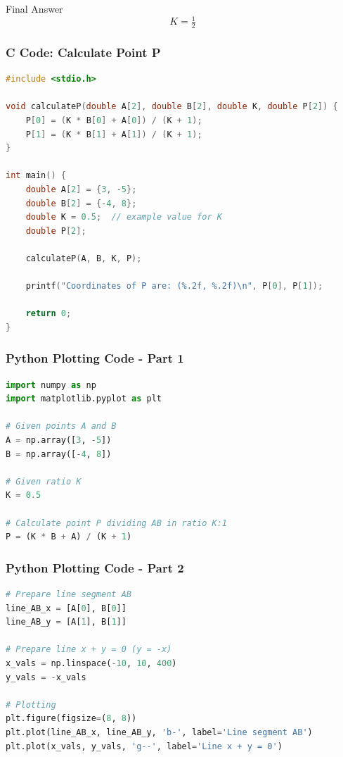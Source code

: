 \documentclass{beamer}
\begin{document}
\begin{frame}{Final Answer}
\[
\boxed{K = \tfrac{1}{2}}
\]
\end{frame}

\begin{frame}[fragile]
\frametitle{\textbf{C Code: Calculate Point P}}
\begin{lstlisting}[language=C]
#include <stdio.h>

void calculateP(double A[2], double B[2], double K, double P[2]) {
    P[0] = (K * B[0] + A[0]) / (K + 1);
    P[1] = (K * B[1] + A[1]) / (K + 1);
}

int main() {
    double A[2] = {3, -5};
    double B[2] = {-4, 8};
    double K = 0.5;  // example value for K
    double P[2];

    calculateP(A, B, K, P);

    printf("Coordinates of P are: (%.2f, %.2f)\n", P[0], P[1]);

    return 0;
}
\end{lstlisting}
\end{frame}

\begin{frame}[fragile]
\frametitle{\textbf{Python Plotting Code - Part 1}}
\begin{lstlisting}[language=Python]
import numpy as np
import matplotlib.pyplot as plt

# Given points A and B
A = np.array([3, -5])
B = np.array([-4, 8])

# Given ratio K
K = 0.5

# Calculate point P dividing AB in ratio K:1
P = (K * B + A) / (K + 1)
\end{lstlisting}
\end{frame}

\begin{frame}[fragile]
\frametitle{\textbf{Python Plotting Code - Part 2}}
\begin{lstlisting}[language=Python]
# Prepare line segment AB
line_AB_x = [A[0], B[0]]
line_AB_y = [A[1], B[1]]

# Prepare line x + y = 0 (y = -x)
x_vals = np.linspace(-10, 10, 400)
y_vals = -x_vals

# Plotting
plt.figure(figsize=(8, 8))
plt.plot(line_AB_x, line_AB_y, 'b-', label='Line segment AB')
plt.plot(x_vals, y_vals, 'g--', label='Line x + y = 0')
\end{lstlisting}
\end{frame}
\end{document}

